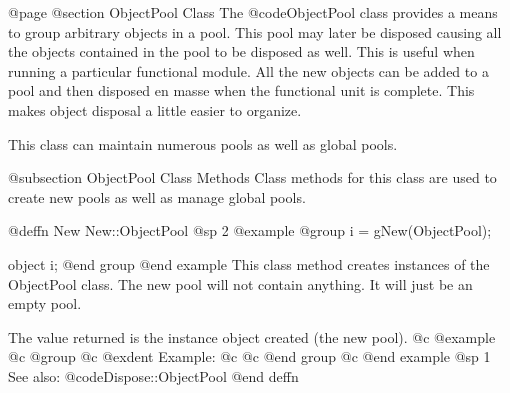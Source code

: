 
@page
@section ObjectPool Class
The @code{ObjectPool} class provides a means to group arbitrary objects in a pool.
This pool may later be disposed causing all the objects contained in the pool to
be disposed as well.  This is useful when running a particular functional module.
All the new objects can be added to a pool and then disposed en masse when the functional
unit is complete.  This makes object disposal a little easier to organize.

This class can maintain numerous pools as well as global pools.

@subsection ObjectPool Class Methods
Class methods for this class are used to create new pools as well as manage global pools.





@deffn {New} New::ObjectPool
@sp 2
@example
@group
i = gNew(ObjectPool);

object  i;
@end group
@end example
This class method creates instances of the ObjectPool class.  The new pool
will not contain anything.  It will just be an empty pool.

The value returned is the instance object created (the new pool).
@c @example
@c @group
@c @exdent Example:
@c 
@c @end group
@c @end example
@sp 1
See also:  @code{Dispose::ObjectPool}
@end deffn

